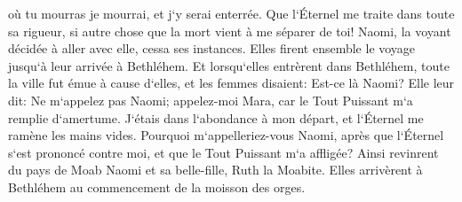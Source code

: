 \verse où tu mourras je mourrai, et j`y serai enterrée. Que l`Éternel me traite dans toute sa rigueur, si autre chose que la mort vient à me séparer de toi! 
\verse Naomi, la voyant décidée à aller avec elle, cessa ses instances. 
\verse Elles firent ensemble le voyage jusqu`à leur arrivée à Bethléhem. Et lorsqu`elles entrèrent dans Bethléhem, toute la ville fut émue à cause d`elles, et les femmes disaient: Est-ce là Naomi? 
\verse Elle leur dit: Ne m`appelez pas Naomi; appelez-moi Mara, car le Tout Puissant m`a remplie d`amertume. 
\verse J`étais dans l`abondance à mon départ, et l`Éternel me ramène les mains vides. Pourquoi m`appelleriez-vous Naomi, après que l`Éternel s`est prononcé contre moi, et que le Tout Puissant m`a affligée? 
\verse Ainsi revinrent du pays de Moab Naomi et sa belle-fille, Ruth la Moabite. Elles arrivèrent à Bethléhem au commencement de la moisson des orges. 

